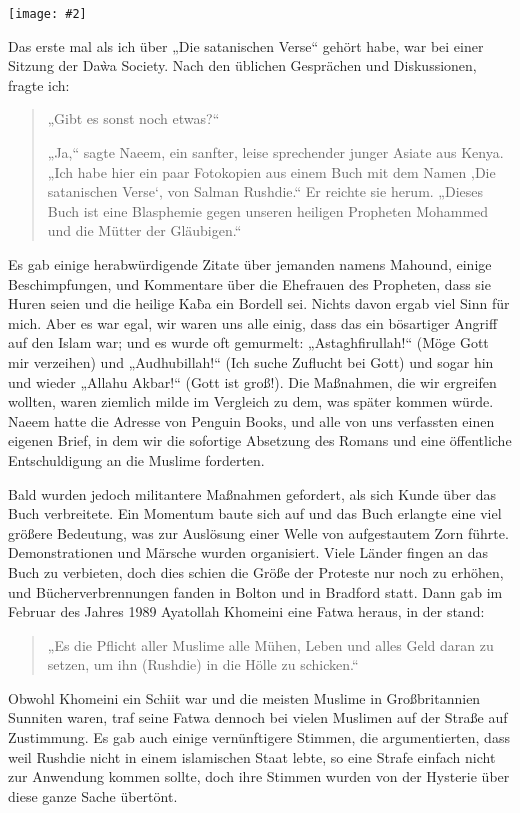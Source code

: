 \documentclass[12pt]{memoir}
\newcommand{\img}[3]{\begin{center}%
\texttt{[image: \#2]}\\{\small\em#3}%
\end{center}}
\begin{document}
\img{scale=1}{Satanic_Verses_Demo.jpg}{}

Das erste mal als ich über „Die satanischen Verse“ gehört habe,
war bei einer Sitzung der Da\`wa Society.
Nach den üblichen Gesprächen und Diskussionen, fragte ich:

\begin{quote}
„Gibt es sonst noch etwas?“

„Ja,“ sagte Naeem, ein sanfter, leise sprechender junger Asiate aus Kenya.
„Ich habe hier ein paar Fotokopien aus einem Buch
mit dem Namen ‚Die satanischen Verse‘, von Salman Rushdie.“
Er reichte sie herum.
„Dieses Buch ist eine Blasphemie gegen unseren heiligen Propheten Mohammed
und die Mütter der Gläubigen.“
\end{quote}

Es gab einige herabwürdigende Zitate über jemanden namens Mahound,
einige Beschimpfungen, und Kommentare über die Ehefrauen des Propheten,
dass sie Huren seien und die heilige Ka\`ba ein Bordell sei.
Nichts davon ergab viel Sinn für mich.
Aber es war egal, wir waren uns alle einig,
dass das ein bösartiger Angriff auf den Islam war;
und es wurde oft gemurmelt:
„Astaghfirullah!“ (Möge Gott mir verzeihen) und
„Audhubillah!“ (Ich suche Zuflucht bei Gott)
und sogar hin und wieder „Allahu Akbar!“ (Gott ist groß!).
Die Maßnahmen, die wir ergreifen wollten, waren ziemlich milde
im Vergleich zu dem, was später kommen würde.
Naeem hatte die Adresse von Penguin Books,
und alle von uns verfassten einen eigenen Brief,
in dem wir die sofortige Absetzung des Romans
und eine öffentliche Entschuldigung an die Muslime forderten.

Bald wurden jedoch militantere Maßnahmen gefordert,
als sich Kunde über das Buch verbreitete.
Ein Momentum baute sich auf und das Buch erlangte eine viel größere Bedeutung,
was zur Auslösung einer Welle von aufgestautem Zorn führte.
Demonstrationen und Märsche wurden organisiert.
Viele Länder fingen an das Buch zu verbieten,
doch dies schien die Größe der Proteste nur noch zu erhöhen,
und Bücherverbrennungen fanden in Bolton und in Bradford statt.
Dann gab im Februar des Jahres 1989 Ayatollah Khomeini
eine Fatwa heraus, in der stand:

\begin{quote}
„Es die Pflicht aller Muslime alle Mühen, Leben und alles Geld
daran zu setzen, um ihn (Rushdie) in die Hölle zu schicken.“
\end{quote}

Obwohl Khomeini ein Schiit war und die meisten Muslime
in Großbritannien Sunniten waren,
traf seine Fatwa dennoch bei vielen Muslimen auf der Straße auf Zustimmung.
Es gab auch einige vernünftigere Stimmen,
die argumentierten, dass weil Rushdie nicht in einem islamischen Staat lebte,
so eine Strafe einfach nicht zur Anwendung kommen sollte,
doch ihre Stimmen wurden von der Hysterie über diese ganze Sache übertönt.
\end{document}
